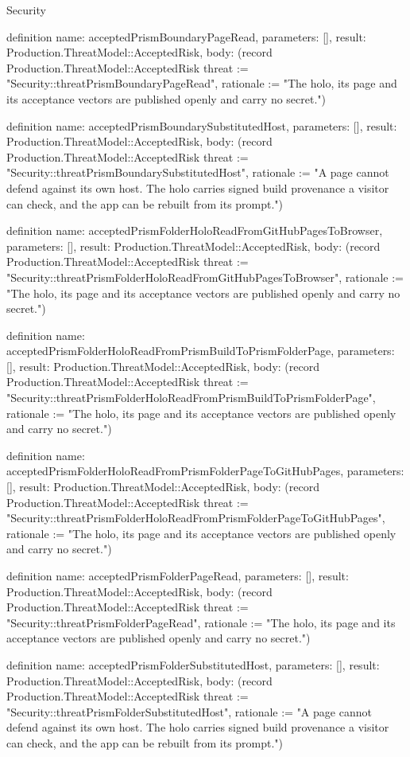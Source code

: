 \begin{lexlean}{Security}
\begin{semanticmodule}
definition{
  name: acceptedPrismBoundaryPageRead,
  parameters: [],
  result: Production.ThreatModel::AcceptedRisk,
  body: (record Production.ThreatModel::AcceptedRisk {threat := "Security::threatPrismBoundaryPageRead", rationale := "The holo, its page and its acceptance vectors are published openly and carry no secret."})
}

definition{
  name: acceptedPrismBoundarySubstitutedHost,
  parameters: [],
  result: Production.ThreatModel::AcceptedRisk,
  body: (record Production.ThreatModel::AcceptedRisk {threat := "Security::threatPrismBoundarySubstitutedHost", rationale := "A page cannot defend against its own host. The holo carries signed build provenance a visitor can check, and the app can be rebuilt from its prompt."})
}

definition{
  name: acceptedPrismFolderHoloReadFromGitHubPagesToBrowser,
  parameters: [],
  result: Production.ThreatModel::AcceptedRisk,
  body: (record Production.ThreatModel::AcceptedRisk {threat := "Security::threatPrismFolderHoloReadFromGitHubPagesToBrowser", rationale := "The holo, its page and its acceptance vectors are published openly and carry no secret."})
}

definition{
  name: acceptedPrismFolderHoloReadFromPrismBuildToPrismFolderPage,
  parameters: [],
  result: Production.ThreatModel::AcceptedRisk,
  body: (record Production.ThreatModel::AcceptedRisk {threat := "Security::threatPrismFolderHoloReadFromPrismBuildToPrismFolderPage", rationale := "The holo, its page and its acceptance vectors are published openly and carry no secret."})
}

definition{
  name: acceptedPrismFolderHoloReadFromPrismFolderPageToGitHubPages,
  parameters: [],
  result: Production.ThreatModel::AcceptedRisk,
  body: (record Production.ThreatModel::AcceptedRisk {threat := "Security::threatPrismFolderHoloReadFromPrismFolderPageToGitHubPages", rationale := "The holo, its page and its acceptance vectors are published openly and carry no secret."})
}

definition{
  name: acceptedPrismFolderPageRead,
  parameters: [],
  result: Production.ThreatModel::AcceptedRisk,
  body: (record Production.ThreatModel::AcceptedRisk {threat := "Security::threatPrismFolderPageRead", rationale := "The holo, its page and its acceptance vectors are published openly and carry no secret."})
}

definition{
  name: acceptedPrismFolderSubstitutedHost,
  parameters: [],
  result: Production.ThreatModel::AcceptedRisk,
  body: (record Production.ThreatModel::AcceptedRisk {threat := "Security::threatPrismFolderSubstitutedHost", rationale := "A page cannot defend against its own host. The holo carries signed build provenance a visitor can check, and the app can be rebuilt from its prompt."})
}


\end{semanticmodule}
\end{lexlean}
